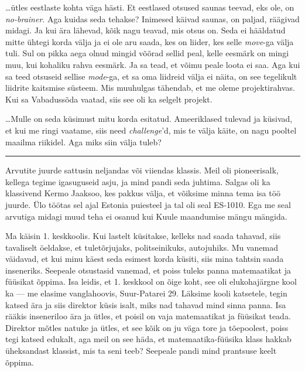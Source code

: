 
\ldots ütles eestlaste kohta väga hästi. Et eestlased otsused saunas 
teevad, eks ole, on \emph{no-brainer}. Aga kuidas seda tehakse? 
Inimesed käivad saunas, on paljad, räägivad midagi. Ja kui ära 
lähevad, kõik nagu teavad, mis otsus on. Seda ei hääldatud mitte ühtegi korda 
välja 
ja ei ole aru saada, kes on liider, kes selle \emph{move}-ga välja tuli. 
Sul on pikka aega olnud mingid võõrad sellid peal, 
kelle eesmärk on mingi muu, kui kohaliku rahva eesmärk. Ja sa tead, et võimu 
peale loota ei saa. Aga kui sa teed otsuseid sellise \emph{mode}-ga, et sa oma 
liidreid välja ei näita, on see tegelikult liidrite kaitsmise süsteem. Mis 
muuhulgas tähendab, et me oleme projektirahvas. Kui sa Vabadussõda vaatad, 
siis see oli ka selgelt projekt.

\ldots Mulle on seda küsimust mitu korda esitatud. Ameeriklased tulevad ja 
küsivad, et kui me ringi vaatame, siis need \emph{challenge}'d, mis te 
välja käite, on nagu pooltel maailma riikidel. Aga miks siin välja tuleb?

\bigskip
\noindent\rule{.3\textwidth}{.7pt}
\bigskip


Arvutite juurde sattusin neljandas või viiendas klassis. Meil oli pioneerisalk, kellega tegime igasuguseid asju, ja mind pandi seda juhtima. Salgas oli ka klassivend Kermo 
Jaaksoo, kes pakkus välja, et võiksime 
minna tema isa töö juurde. Ülo töötas sel ajal 
Estonia puiesteel ja tal oli seal ES-1010. Ega me seal arvutiga midagi muud teha ei 
osanud kui Kuule maandumise mängu mängida. 

Ma käisin 1. keskkoolis. Kui lastelt küsitakse, kelleks nad saada tahavad, siis tavaliselt 
öeldakse, et tuletõrjujaks, politseinikuks, autojuhiks. Mu vanemad 
väidavad, et kui minu käest seda esimest korda küsiti, siis mina tahtsin saada
inseneriks. Seepeale otsustasid
vanemad, et poiss tuleks panna matemaatikat ja füüsikat õppima. Isa leidis, et 1. keskkool on õige koht, see 
oli elukohajärgne kool ka --- me elasime vanglahoovis, Suur-Patarei 29. 
Läksime kooli katsetele, tegin katsed ära ja siis direktor küsis isalt, 
miks nad tahavad mind sinna panna. Isa rääkis inseneriloo ära ja ütles, et poisil on vaja 
matemaatikat ja füüsikat teada. Direktor mõtles natuke ja ütles, et see kõik on ju väga tore ja tõepoolest, poiss tegi katsed 
edukalt, aga meil on see häda, et matemaatika-füüsika klass hakkab üheksandast 
klassist, mis ta seni teeb? Seepeale pandi mind prantsuse keelt õppima.

